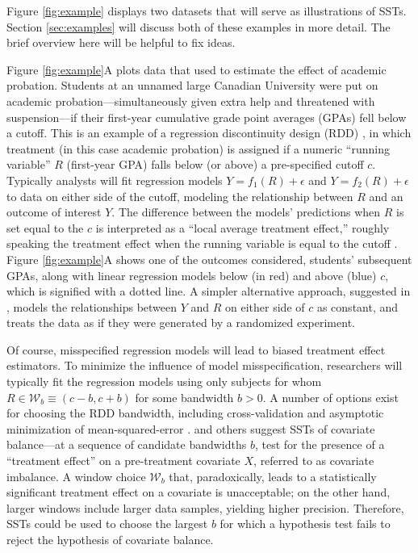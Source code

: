 \documentclass[sts]{imsart}\usepackage[]{graphicx}\usepackage[]{color}
\begin{document}
Figure \ref{fig:example} displays two datasets that will serve as
illustrations of SSTs.
Section \ref{sec:examples} will discuss both of these examples in more
detail.
The brief overview here will be helpful to fix ideas.

Figure \ref{fig:example}A plots data that \citet{lso} used to estimate the effect of academic
probation.
Students at an unnamed large Canadian University were put on academic
probation---simultaneously given extra help and threatened with
suspension---if their first-year cumulative grade point averages
(GPAs) fell below a cutoff.
This is an example of a regression discontinuity design (RDD) \citep{thistlewhiteCampbell}, in
which treatment (in this case academic probation) is assigned if a
numeric ``running variable'' $R$ (first-year GPA) falls below (or above) a
pre-specified cutoff $c$.
Typically \citep[e.g.][]{imbensLemiuxRDD,angristLavy,lee} analysts
will fit regression models $Y=f_1(R)+\epsilon$ and $Y=f_2(R)+\epsilon$
to data on either side of the cutoff, modeling the relationship
between $R$ and an outcome of interest $Y$.
The difference between the models' predictions when $R$ is set equal
to the $c$ is interpreted as a ``local
average treatment effect,'' roughly speaking the treatment effect when
the running variable is equal to the cutoff \citep{HTV}.
Figure \ref{fig:example}A shows one of the outcomes \citet{lso} considered,
students' subsequent GPAs, along with linear regression models below
(in red) and above (blue) $c$, which is signified with a dotted
line.
A simpler alternative approach, suggested in \citet{cft}, models the
relationships between $Y$ and $R$ on either side of $c$ as constant,
and treats the data as if they were generated by a randomized
experiment.

Of course, misspecified regression models will lead to biased
treatment effect estimators.
To minimize the influence of model misspecification, researchers will
typically fit the regression models using only subjects for whom $R\in
\mathcal{W}_b\equiv (c-b,c+b)$ for some bandwidth $b>0$.
A number of options exist for choosing the RDD bandwidth, including
cross-validation \citep{ludwigMiller} and asymptotic minimization of
mean-squared-error \citep{IK}.
\citet{cft} and others \citet{salesHansen,angristWanna} suggest SSTs
of covariate balance---at a sequence of candidate bandwidths $b$, test
for the presence of a ``treatment effect'' on a pre-treatment
covariate $X$, referred to as covariate imbalance.
A window choice $\mathcal{W}_b$ that, paradoxically, leads to a
statistically significant
treatment effect on a covariate is unacceptable; on the other
hand, larger windows include larger data samples, yielding higher
precision.
Therefore, SSTs could be used to choose the largest $b$ for which a
hypothesis test fails to reject the hypothesis of covariate balance.
\end{document}
